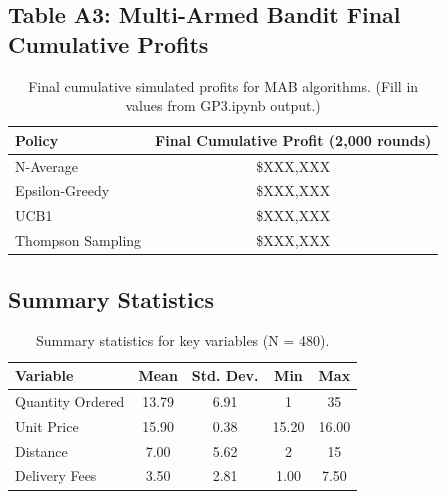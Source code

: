 \documentclass[12pt]{article}
\begin{document}
\subsection{Table A3: Multi-Armed Bandit Final Cumulative Profits}

\begin{table}[H]
\centering
\begin{tabular}{lc}
\toprule
\textbf{Policy} & \textbf{Final Cumulative Profit (2,000 rounds)} \\
\midrule
N-Average & \$XXX,XXX \\
Epsilon-Greedy & \$XXX,XXX \\
UCB1 & \$XXX,XXX \\
Thompson Sampling & \$XXX,XXX \\
\bottomrule
\end{tabular}
\caption{Final cumulative simulated profits for MAB algorithms. (Fill in values from GP3.ipynb output.)}
\label{tab:mab_final}
\end{table}

\subsection{Summary Statistics}

\begin{table}[H]
\centering
\small
\begin{tabular}{lcccc}
\toprule
\textbf{Variable} & \textbf{Mean} & \textbf{Std. Dev.} & \textbf{Min} & \textbf{Max} \\
\midrule
Quantity Ordered & 13.79 & 6.91 & 1 & 35 \\
Unit Price & 15.90 & 0.38 & 15.20 & 16.00 \\
Distance & 7.00 & 5.62 & 2 & 15 \\
Delivery Fees & 3.50 & 2.81 & 1.00 & 7.50 \\
\bottomrule
\end{tabular}
\caption{Summary statistics for key variables (N = 480).}
\label{tab:summary}
\end{table}
\end{document}
